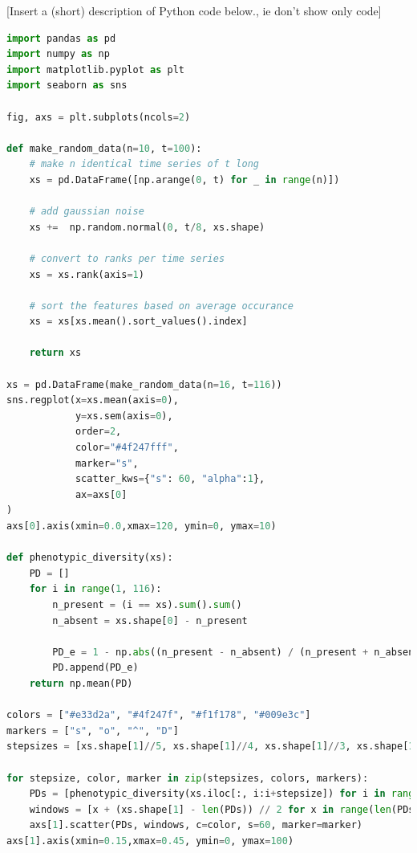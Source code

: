 [Insert a (short) description of Python code below., ie don't show only code]
\begin{lstlisting}[language=Python]
import pandas as pd
import numpy as np
import matplotlib.pyplot as plt
import seaborn as sns

fig, axs = plt.subplots(ncols=2)

def make_random_data(n=10, t=100):
    # make n identical time series of t long
    xs = pd.DataFrame([np.arange(0, t) for _ in range(n)])
    
    # add gaussian noise
    xs +=  np.random.normal(0, t/8, xs.shape) 
    
    # convert to ranks per time series
    xs = xs.rank(axis=1)
    
    # sort the features based on average occurance
    xs = xs[xs.mean().sort_values().index]
    
    return xs

xs = pd.DataFrame(make_random_data(n=16, t=116))
sns.regplot(x=xs.mean(axis=0), 
            y=xs.sem(axis=0),
            order=2,
            color="#4f247fff", 
            marker="s",
            scatter_kws={"s": 60, "alpha":1},
            ax=axs[0]
)
axs[0].axis(xmin=0.0,xmax=120, ymin=0, ymax=10)

def phenotypic_diversity(xs):
    PD = []
    for i in range(1, 116):
        n_present = (i == xs).sum().sum()
        n_absent = xs.shape[0] - n_present

        PD_e = 1 - np.abs((n_present - n_absent) / (n_present + n_absent))
        PD.append(PD_e)
    return np.mean(PD)

colors = ["#e33d2a", "#4f247f", "#f1f178", "#009e3c"]
markers = ["s", "o", "^", "D"]
stepsizes = [xs.shape[1]//5, xs.shape[1]//4, xs.shape[1]//3, xs.shape[1]//2]

for stepsize, color, marker in zip(stepsizes, colors, markers):
    PDs = [phenotypic_diversity(xs.iloc[:, i:i+stepsize]) for i in range(0, xs.shape[1] - stepsize)]
    windows = [x + (xs.shape[1] - len(PDs)) // 2 for x in range(len(PDs))]
    axs[1].scatter(PDs, windows, c=color, s=60, marker=marker)
axs[1].axis(xmin=0.15,xmax=0.45, ymin=0, ymax=100)
\end{lstlisting}

